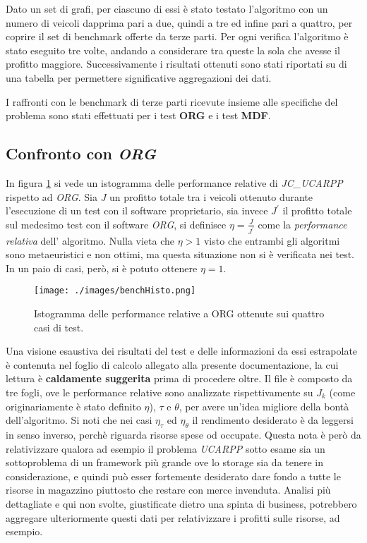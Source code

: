 Dato un set di grafi, per ciascuno di essi è stato testato l'algoritmo con un numero di veicoli dapprima pari a due, 
quindi a tre ed infine pari a quattro, per coprire il set di benchmark offerte da terze parti. Per ogni verifica l'algoritmo è stato eseguito tre volte, 
andando a considerare tra queste la sola che avesse il profitto maggiore. Successivamente i risultati ottenuti sono stati riportati su di una tabella per
permettere significative aggregazioni dei dati.

I raffronti con le benchmark di terze parti ricevute insieme alle specifiche del problema sono stati effettuati per i test \textbf{ORG} e i test \textbf{MDF}.

\subsection{Confronto con \emph{ORG}}
In figura \ref{fig:benchHisto} si vede un istogramma delle performance relative di \emph{JC\_UCARPP} rispetto ad \emph{ORG}. 
Sia $J$ un profitto totale tra i veicoli ottenuto durante l'esecuzione di un test con il software proprietario,
sia invece $J^\prime$ il profitto totale sul medesimo test con il software \emph{ORG}, si definisce $\eta= \frac{J}{J^\prime}$ come la \emph{performance relativa} dell'
algoritmo. Nulla vieta che $\eta > 1$ visto che entrambi gli algoritmi sono metaeuristici e non ottimi, ma questa situazione non si è verificata nei test. 
In un paio di casi, però, si è potuto ottenere $\eta = 1$. 

\begin{figure}[H] 
 	\begin{center}\texttt{[image: ./images/benchHisto.png]}
 	\end{center} 
 	\caption{Istogramma delle performance relative a ORG ottenute sui quattro casi di test.}
 	\label{fig:benchHisto}
\end{figure}

Una visione esaustiva dei risultati del test e delle informazioni da essi estrapolate è contenuta nel foglio di calcolo allegato alla presente documentazione,
la cui lettura è \textbf{caldamente suggerita} prima di procedere oltre. Il file è composto da tre fogli, ove le performance relative sono analizzate rispettivamente su
$J_k$ (come originariamente è stato definito $\eta$), $\tau$ e $\theta$, per avere un'idea migliore della bontà dell'algoritmo.
Si noti che nei casi $\eta_\tau$ ed $\eta_\theta$ il rendimento desiderato è da leggersi in senso inverso, perchè riguarda risorse spese od occupate. Questa nota è però da relativizzare
qualora ad esempio il problema \emph{UCARPP} sotto esame sia un sottoproblema di un framework più grande ove lo storage sia da tenere in considerazione, e quindi può esser fortemente desiderato
dare fondo a tutte le risorse in magazzino piuttosto che restare con merce invenduta. 
Analisi più dettagliate e qui non svolte, giustificate dietro una spinta di business, potrebbero aggregare ulteriormente questi dati per relativizzare i profitti sulle risorse, ad esempio.

